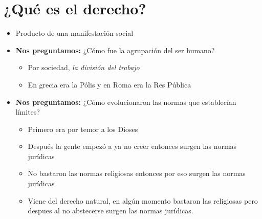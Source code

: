 \section{¿Qué es el derecho?}
\begin{itemize}
    \item Producto de una manifestación social
    \item \textbf{Nos preguntamos:} ¿Cómo fue la agrupación del ser humano?
    \begin{itemize}
        \item Por sociedad, \emph{la división del trabajo} 
        \item En grecia era la Pólis y en Roma era la Res Pública
    \end{itemize}


    \item \textbf{Nos preguntamos:} ¿Cómo evolucionaron las normas que establecían límites?
    \begin{itemize}
        \item Primero era por temor a los Dioses
        \item Después la gente empezó a ya no creer entonces surgen las normas jurídicas
        \item No bastaron las normas religiosas entonces por eso surgen las normas jurídicas
        \item Viene del derecho natural, en algún momento bastaron las religiosas pero despues al no abstecerse surgen las normas jurídicas.
    \end{itemize} 
\end{itemize}

